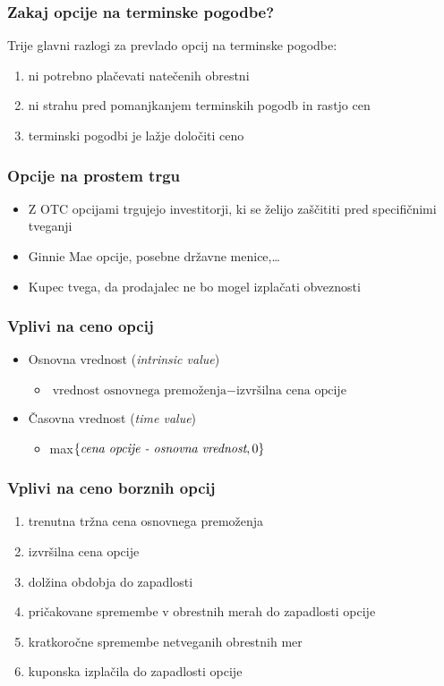 \documentclass[14pt]{beamer}
\begin{document}
\begin{frame}
    \frametitle{Zakaj opcije na terminske pogodbe?}
    Trije glavni razlogi za prevlado opcij na terminske pogodbe:
    \begin{enumerate}
        \item ni potrebno plačevati natečenih obrestni
        \item ni strahu pred pomanjkanjem terminskih pogodb in rastjo cen
        \item terminski pogodbi je lažje določiti ceno
    \end{enumerate}
\end{frame}
        
\begin{frame}    
    \frametitle{Opcije na prostem trgu}
    \begin{itemize}
        \item Z OTC opcijami trgujejo investitorji, ki se želijo zaščititi pred specifičnimi tveganji
        \item Ginnie Mae opcije, posebne državne menice,\ldots
        \item Kupec tvega, da prodajalec ne bo mogel izplačati obveznosti
    \end{itemize}
\end{frame}

\begin{frame}
    \frametitle{Vplivi na ceno opcij}
    \begin{itemize}
        \item Osnovna vrednost (\textit{intrinsic value})
        \begin{itemize}
            \item \textit{$ \text{vrednost osnovnega premoženja} - \text{izvršilna cena opcije} $}
        \end{itemize}
        \pause
            \item Časovna vrednost (\textit{time value})
            \begin{itemize}
                \item max$\{\textit{\text{cena opcije} - \text{osnovna vrednost}},0 \}$
            \end{itemize}
    \end{itemize}
\end{frame}

\begin{frame}
    \frametitle{Vplivi na ceno borznih opcij}
        \begin{enumerate}
            \item trenutna tržna cena osnovnega premoženja
            \item izvršilna cena opcije
            \item dolžina obdobja do zapadlosti
            \item pričakovane spremembe v obrestnih merah do zapadlosti opcije
            \item kratkoročne spremembe netveganih obrestnih mer
            \item kuponska izplačila do zapadlosti opcije
        \end{enumerate}
\end{frame}
\end{document}
